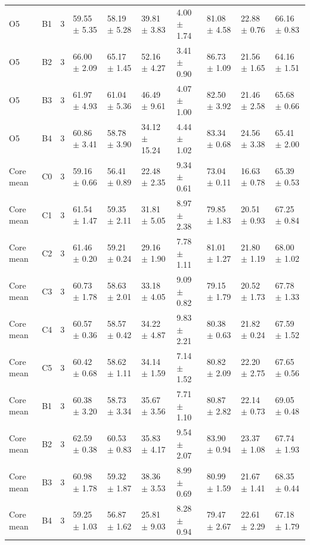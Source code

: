 \begin{table}[t]
\begin{tabular}{llllllllll}
O5 & B1 & 3 & 59.55 $\pm$ 5.35 & 58.19 $\pm$ 5.28 & 39.81 $\pm$ 3.83 & 4.00 $\pm$ 1.74 & 81.08 $\pm$ 4.58 & 22.88 $\pm$ 0.76 & 66.16 $\pm$ 0.83 \\
O5 & B2 & 3 & 66.00 $\pm$ 2.09 & 65.17 $\pm$ 1.45 & 52.16 $\pm$ 4.27 & 3.41 $\pm$ 0.90 & 86.73 $\pm$ 1.09 & 21.56 $\pm$ 1.65 & 64.16 $\pm$ 1.51 \\
O5 & B3 & 3 & 61.97 $\pm$ 4.93 & 61.04 $\pm$ 5.36 & 46.49 $\pm$ 9.61 & 4.07 $\pm$ 1.00 & 82.50 $\pm$ 3.92 & 21.46 $\pm$ 2.58 & 65.68 $\pm$ 0.66 \\
O5 & B4 & 3 & 60.86 $\pm$ 3.41 & 58.78 $\pm$ 3.90 & 34.12 $\pm$ 15.24 & 4.44 $\pm$ 1.02 & 83.34 $\pm$ 0.68 & 24.56 $\pm$ 3.38 & 65.41 $\pm$ 2.00 \\
Core mean & C0 & 3 & 59.16 $\pm$ 0.66 & 56.41 $\pm$ 0.89 & 22.48 $\pm$ 2.35 & 9.34 $\pm$ 0.61 & 73.04 $\pm$ 0.11 & 16.63 $\pm$ 0.78 & 65.39 $\pm$ 0.53 \\
Core mean & C1 & 3 & 61.54 $\pm$ 1.47 & 59.35 $\pm$ 2.11 & 31.81 $\pm$ 5.05 & 8.97 $\pm$ 2.38 & 79.85 $\pm$ 1.83 & 20.51 $\pm$ 0.93 & 67.25 $\pm$ 0.84 \\
Core mean & C2 & 3 & 61.46 $\pm$ 0.20 & 59.21 $\pm$ 0.24 & 29.16 $\pm$ 1.90 & 7.78 $\pm$ 1.11 & 81.01 $\pm$ 1.27 & 21.80 $\pm$ 1.19 & 68.00 $\pm$ 1.02 \\
Core mean & C3 & 3 & 60.73 $\pm$ 1.78 & 58.63 $\pm$ 2.01 & 33.18 $\pm$ 4.05 & 9.09 $\pm$ 0.82 & 79.15 $\pm$ 1.79 & 20.52 $\pm$ 1.73 & 67.78 $\pm$ 1.33 \\
Core mean & C4 & 3 & 60.57 $\pm$ 0.36 & 58.57 $\pm$ 0.42 & 34.22 $\pm$ 4.87 & 9.83 $\pm$ 2.21 & 80.38 $\pm$ 0.63 & 21.82 $\pm$ 0.24 & 67.59 $\pm$ 1.52 \\
Core mean & C5 & 3 & 60.42 $\pm$ 0.68 & 58.62 $\pm$ 1.11 & 34.14 $\pm$ 1.59 & 7.14 $\pm$ 1.52 & 80.82 $\pm$ 2.09 & 22.20 $\pm$ 2.75 & 67.65 $\pm$ 0.56 \\
Core mean & B1 & 3 & 60.38 $\pm$ 3.20 & 58.73 $\pm$ 3.34 & 35.67 $\pm$ 3.56 & 7.71 $\pm$ 1.10 & 80.87 $\pm$ 2.82 & 22.14 $\pm$ 0.73 & 69.05 $\pm$ 0.48 \\
Core mean & B2 & 3 & 62.59 $\pm$ 0.38 & 60.53 $\pm$ 0.83 & 35.83 $\pm$ 4.17 & 9.54 $\pm$ 2.07 & 83.90 $\pm$ 0.94 & 23.37 $\pm$ 1.08 & 67.74 $\pm$ 1.93 \\
Core mean & B3 & 3 & 60.98 $\pm$ 1.78 & 59.32 $\pm$ 1.87 & 38.36 $\pm$ 3.53 & 8.99 $\pm$ 0.69 & 80.99 $\pm$ 1.59 & 21.67 $\pm$ 1.41 & 68.35 $\pm$ 0.44 \\
Core mean & B4 & 3 & 59.25 $\pm$ 1.03 & 56.87 $\pm$ 1.62 & 25.81 $\pm$ 9.03 & 8.28 $\pm$ 0.94 & 79.47 $\pm$ 2.67 & 22.61 $\pm$ 2.29 & 67.18 $\pm$ 1.79 \\
\hline
\end{tabular}
\end{table}
